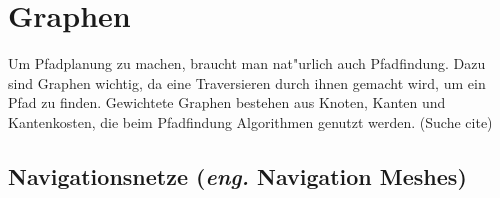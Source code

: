 \chapter{Graphen}

Um Pfadplanung zu machen, braucht man nat"urlich auch Pfadfindung. Dazu sind Graphen wichtig, da eine Traversieren durch ihnen gemacht wird, um ein Pfad zu finden. Gewichtete Graphen bestehen aus Knoten, Kanten und Kantenkosten, die beim Pfadfindung Algorithmen genutzt werden.
(Suche cite)

\section{Navigationsnetze (\textit{eng.} Navigation Meshes)}
%
